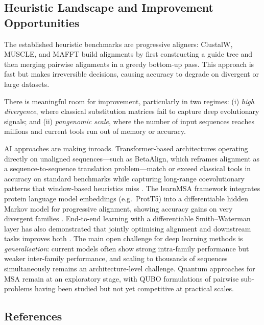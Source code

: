\documentclass[11pt]{article}
\begin{document}
\subsection*{Heuristic Landscape and Improvement Opportunities}

The established heuristic benchmarks are progressive aligners: ClustalW, MUSCLE, 
and MAFFT build alignments by first constructing a guide tree and then merging 
pairwise alignments in a greedy bottom-up pass. This approach is fast but makes 
irreversible decisions, causing accuracy to degrade on divergent or large datasets.

There is meaningful room for improvement, particularly in two regimes: (i) 
\emph{high divergence}, where classical substitution matrices fail to capture deep 
evolutionary signals; and (ii) \emph{pangenomic scale}, where the number of input 
sequences reaches millions and current tools run out of memory or accuracy.

AI approaches are making inroads. Transformer-based architectures operating directly 
on unaligned sequences---such as BetaAlign, which reframes alignment as a 
sequence-to-sequence translation problem---match or exceed classical tools in accuracy 
on standard benchmarks while capturing long-range coevolutionary patterns that 
window-based heuristics miss \cite{Dotan2024}. The learnMSA framework integrates 
protein language model embeddings (e.g.\ ProtT5) into a differentiable hidden Markov 
model for progressive alignment, showing accuracy gains on very divergent families 
\cite{learnMSA2024}. End-to-end learning with a differentiable Smith--Waterman layer 
has also demonstrated that jointly optimising alignment and downstream tasks improves 
both \cite{Petti2023}. The main open challenge for deep learning methods is 
\emph{generalisation}: current models often show strong intra-family performance but 
weaker inter-family performance, and scaling to thousands of sequences simultaneously 
remains an architecture-level challenge.
Quantum approaches for MSA remain at an exploratory stage, with QUBO formulations of 
pairwise sub-problems having been studied but not yet competitive at practical scales.

\subsection*{References}
\end{document}
